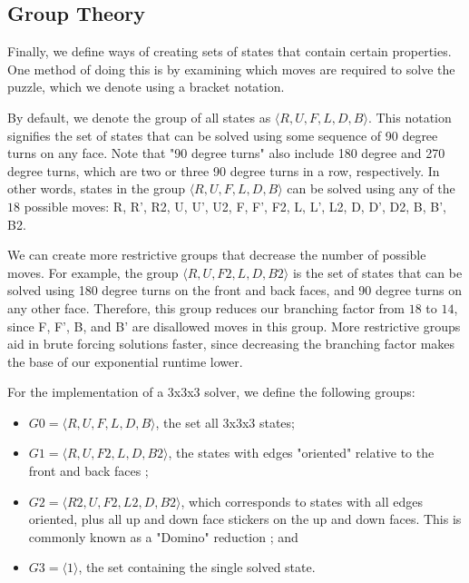 \documentclass{article}
\begin{document}
\subsection{Group Theory}

Finally, we define ways of creating sets of states that contain certain properties. One method of doing this is by examining which moves are required to solve the puzzle, which we denote using a bracket notation.

By default, we denote the group of all states as $\langle R, U, F, L, D, B \rangle$. This notation signifies the set of states that can be solved using some sequence of 90 degree turns on any face. Note that "90 degree turns" also include 180 degree and 270 degree turns, which are two or three 90 degree turns in a row, respectively. In other words, states in the group $\langle R, U, F, L, D, B \rangle$ can be solved using any of the $18$ possible moves: R, R', R2, U, U', U2, F, F', F2, L, L', L2, D, D', D2, B, B', B2.

We can create more restrictive groups that decrease the number of possible moves. For example, the group $\langle R, U, F2, L, D, B2 \rangle$ is the set of states that can be solved using 180 degree turns on the front and back faces, and 90 degree turns on any other face. Therefore, this group reduces our branching factor from $18$ to $14$, since F, F', B, and B' are disallowed moves in this group. More restrictive groups aid in brute forcing solutions faster, since decreasing the branching factor makes the base of our exponential runtime lower.


For the implementation of a 3x3x3 solver, we define the following groups:

\begin{itemize}
    \item $G0 = \langle R, U, F, L, D, B \rangle$, the set all 3x3x3 states;
    \item $G1 = \langle R, U, F2, L, D, B2 \rangle$, the states with edges "oriented" relative to the front and back faces \cite{eo};
    \item $G2 = \langle R2, U, F2, L2, D, B2 \rangle$, which corresponds to states with all edges oriented, plus all up and down face stickers on the up and down faces. This is commonly known as a "Domino" reduction \cite{domino}; and 
    \item $G3 = \langle 1 \rangle$, the set containing the single solved state.
\end{itemize}
\end{document}
